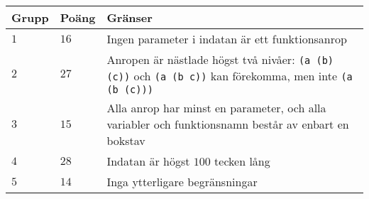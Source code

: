 \noindent
\begin{tabular}{| l | l | p{12cm} |}
  \hline
  \textbf{Grupp} & \textbf{Poäng} & \textbf{Gränser} \\ \hline
  $1$    & $16$      & Ingen parameter i indatan är ett funktionsanrop \\ \hline
  $2$    & $27$      & Anropen är nästlade högst två nivåer: \texttt{(a (b) (c))} och \texttt{(a (b c))} kan förekomma, men inte \texttt{(a (b (c)))} \\ \hline
  $3$    & $15$      & Alla anrop har minst en parameter, och alla variabler och funktionsnamn består av enbart en bokstav \\ \hline
  $4$    & $28$      & Indatan är högst $100$ tecken lång \\ \hline
  $5$    & $14$      & Inga ytterligare begränsningar  \\ \hline
\end{tabular}


